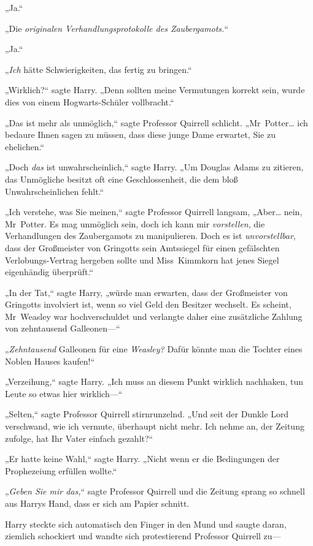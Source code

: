 {„Ja.“

„Die \emph{originalen Verhandlungsprotokolle des Zaubergamots.}“

„Ja.“

„\emph{Ich} hätte Schwierigkeiten, das fertig zu bringen.“

„Wirklich?“ sagte Harry. „Denn sollten meine Vermutungen korrekt sein, wurde dies von einem Hogwarts-Schüler vollbracht.“

„Das ist mehr als unmöglich,“ sagte Professor Quirrell schlicht. „Mr~Potter… ich bedaure Ihnen sagen zu müssen, dass diese junge Dame erwartet, Sie zu ehelichen.“

„Doch \emph{das} ist unwahrscheinlich,“ sagte Harry. „Um Douglas Adams zu zitieren, das Unmögliche besitzt oft eine Geschlossenheit, die dem bloß Unwahrscheinlichen fehlt.“

„Ich verstehe, was Sie meinen,“ sagte Professor Quirrell langsam, „Aber… nein, Mr~Potter. Es mag unmöglich sein, doch ich kann mir \emph{vorstellen}, die Verhandlungen des Zaubergamots zu manipulieren. Doch es ist \emph{unvorstellbar}, dass der Großmeister von Gringotts sein Amtssiegel für einen gefälschten Verlobungs-Vertrag hergeben sollte und Miss~Kimmkorn hat jenes Siegel eigenhändig überprüft.“

„In der Tat,“ sagte Harry, „würde man erwarten, dass der Großmeister von Gringotts involviert ist, wenn so viel Geld den Besitzer wechselt. Es scheint, Mr~Weasley war hochverschuldet und verlangte daher eine zusätzliche Zahlung von zehntausend Galleonen—“

„\emph{Zehntausend} Galleonen für eine \emph{Weasley?} Dafür könnte man die Tochter eines Noblen Hauses kaufen!“

„Verzeihung,“ sagte Harry. „Ich muss an diesem Punkt wirklich nachhaken, tun Leute so etwas hier wirklich—“

„Selten,“ sagte Professor Quirrell stirnrunzelnd. „Und seit der Dunkle Lord verschwand, wie ich vermute, überhaupt nicht mehr. Ich nehme an, der Zeitung zufolge, hat Ihr Vater einfach gezahlt?“

„Er hatte keine Wahl,“ sagte Harry. „Nicht wenn er die Bedingungen der Prophezeiung erfüllen wollte.“

„\emph{Geben Sie mir das,}“ sagte Professor Quirrell und die Zeitung sprang so schnell aus Harrys Hand, dass er sich am Papier schnitt.

Harry steckte sich automatisch den Finger in den Mund und saugte daran, ziemlich schockiert und wandte sich protestierend Professor Quirrell zu—

}
